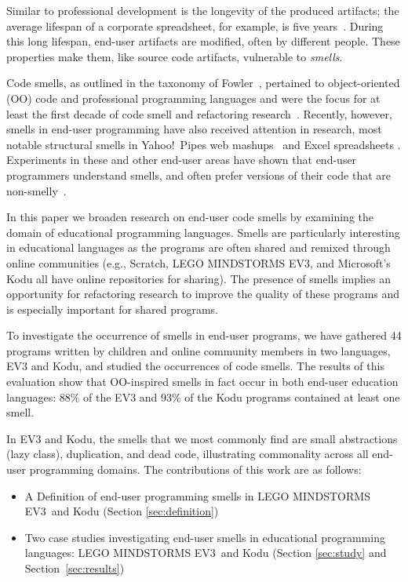 \documentclass[conference]{IEEEtran}
\newcommand{\ms}{LEGO MINDSTORMS EV3}
\begin{document}
Similar to professional development is the longevity of the produced artifacts; the average lifespan of a corporate spreadsheet, for example, is five years~\cite{Hermans2011}. During this long lifespan, end-user artifacts are modified, often by different people.
These properties make them, like source code artifacts, vulnerable to \emph{smells}. 

Code smells, as outlined in the taxonomy of Fowler~\cite{Fowl1999}, pertained to object-oriented (OO) code and professional programming languages and were the focus for at least the first decade of code smell  and refactoring research~\cite{Mens:2004:SSR:972215.972286}. Recently, however, smells in end-user programming have also received attention in research, most notable structural smells in Yahoo!\ Pipes web mashups~\cite{Stolee2011} and Excel spreadsheets \cite{Hermans2012inter}. Experiments in these and other end-user areas have shown that end-user programmers understand smells, and often prefer versions of their code that are non-smelly~\cite{Hermans2012intra, StoleeTSE2013, chambers2013smell}.


In this paper we broaden research on end-user code smells by examining the domain of educational programming languages. Smells are particularly interesting in educational languages as the programs are often shared and remixed through online communities (e.g., Scratch, \ms, and Microsoft's Kodu all have online repositories for sharing). The presence of smells implies an opportunity for refactoring research to improve the quality of these programs and is especially important for shared programs. 

To investigate the occurrence of smells in end-user programs, we have gathered 44 programs written by children and online community members in two languages, EV3 and  Kodu, and studied the occurrences of code smells.
The results of this evaluation show that OO-inspired smells in fact occur in both end-user education languages: 88\% of the EV3 and 93\% of the Kodu programs contained at least one smell. 

In EV3 and Kodu, the smells that we most commonly find are small abstractions (lazy class), duplication, and dead code, illustrating commonality across all end-user programming domains. The contributions of this work are as follows:

\begin{itemize} \itemsep -0.25pt
	\item A Definition of end-user programming smells in \ms~and Kodu  (Section \ref{sec:definition})
	\item Two case studies investigating end-user smells in educational programming languages: \ms~and Kodu   (Section \ref{sec:study} and Section~\ref{sec:results})
\end{itemize}
\end{document}
